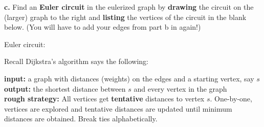 \documentclass[12pt]{article}
\renewcommand{\emph}[1]{\textsf{\textbf{#1}}}
\newcounter{probcount}
\newcounter{subprobcount}
\def\problem#1{\setcounter{subprobcount}{0}%
\addtocounter{probcount}{1}{\emph{\arabic{probcount}.\hskip 1em(#1)}}\par}
\begin{document}
\begin{minipage}{12cm}
\textbf{c.} Find an \emph{Euler circuit} in the eulerized graph by \textbf{drawing} the circuit on the (larger) graph to the right and \textbf{listing} the vertices of the circuit in the blank below. (You will have to add your edges from part b in again!)\\
\vspace{.2in}

Euler circuit:  \hrulefill
\end{minipage}
\newpage

\problem{12 points} Recall Dijkstra's algorithm says the following:

\bigskip
	

\textbf{input:} a graph with distances (weights) on the edges and a starting vertex, say $s$\\
\textbf{output:} the shortest distance between $s$ and every vertex in the graph\\
\textbf{rough strategy:} All vertices get \emph{tentative} distances to vertex $s$. One-by-one, vertices are explored and tentative distances are updated until minimum distances are obtained. Break ties alphabetically.\\
	
\end{document}
